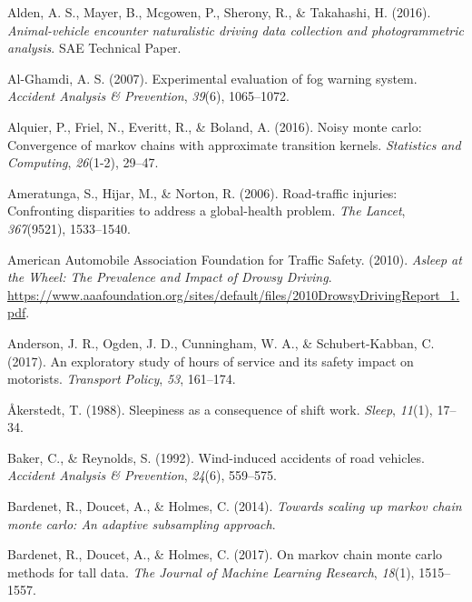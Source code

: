 \documentclass[12pt]{book}
\numberwithin{equation}{chapter}
\begin{document}
\leavevmode\hypertarget{ref-alden2016animal}{}%
Alden, A. S., Mayer, B., Mcgowen, P., Sherony, R., \& Takahashi, H. (2016). \emph{Animal-vehicle encounter naturalistic driving data collection and photogrammetric analysis}. SAE Technical Paper.

\leavevmode\hypertarget{ref-al2007experimental}{}%
Al-Ghamdi, A. S. (2007). Experimental evaluation of fog warning system. \emph{Accident Analysis \& Prevention}, \emph{39}(6), 1065--1072.

\leavevmode\hypertarget{ref-alquier2016noisy}{}%
Alquier, P., Friel, N., Everitt, R., \& Boland, A. (2016). Noisy monte carlo: Convergence of markov chains with approximate transition kernels. \emph{Statistics and Computing}, \emph{26}(1-2), 29--47.

\leavevmode\hypertarget{ref-ameratunga2006road}{}%
Ameratunga, S., Hijar, M., \& Norton, R. (2006). Road-traffic injuries: Confronting disparities to address a global-health problem. \emph{The Lancet}, \emph{367}(9521), 1533--1540.

\leavevmode\hypertarget{ref-aaafoundation}{}%
American Automobile Association Foundation for Traffic Safety. (2010). \emph{Asleep at the Wheel: The Prevalence and Impact of Drowsy Driving}. \url{https://www.aaafoundation.org/sites/default/files/2010DrowsyDrivingReport_1.pdf}.

\leavevmode\hypertarget{ref-anderson2017exploratory}{}%
Anderson, J. R., Ogden, J. D., Cunningham, W. A., \& Schubert-Kabban, C. (2017). An exploratory study of hours of service and its safety impact on motorists. \emph{Transport Policy}, \emph{53}, 161--174.

\leavevmode\hypertarget{ref-aakerstedt1988sleepiness}{}%
Åkerstedt, T. (1988). Sleepiness as a consequence of shift work. \emph{Sleep}, \emph{11}(1), 17--34.

\leavevmode\hypertarget{ref-baker1992wind}{}%
Baker, C., \& Reynolds, S. (1992). Wind-induced accidents of road vehicles. \emph{Accident Analysis \& Prevention}, \emph{24}(6), 559--575.

\leavevmode\hypertarget{ref-bardenet2014towards}{}%
Bardenet, R., Doucet, A., \& Holmes, C. (2014). \emph{Towards scaling up markov chain monte carlo: An adaptive subsampling approach}.

\leavevmode\hypertarget{ref-bardenet2017markov}{}%
Bardenet, R., Doucet, A., \& Holmes, C. (2017). On markov chain monte carlo methods for tall data. \emph{The Journal of Machine Learning Research}, \emph{18}(1), 1515--1557.
\end{document}
